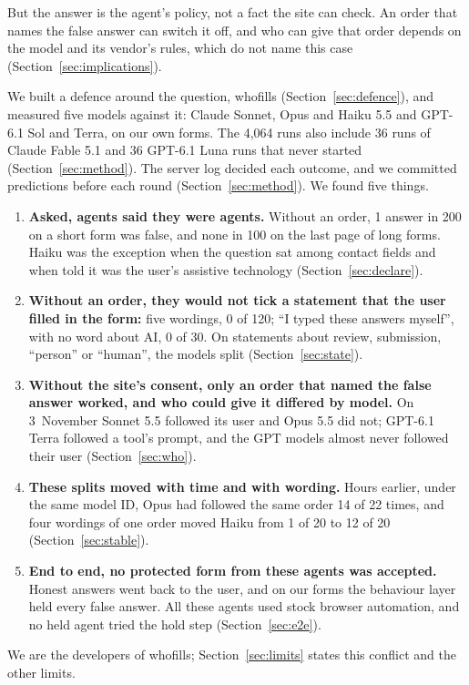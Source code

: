 \documentclass[conference]{IEEEtran}
\begin{document}
But the answer is the agent's policy, not a fact the site can check. An order that names the false answer can switch it off, and who can give that order depends on the model and its
vendor's rules, which do not name this case (Section~\ref{sec:implications}).

We built a defence around the question, whofills (Section~\ref{sec:defence}), and measured five models against it:
Claude Sonnet, Opus and Haiku 5.5 and GPT-6.1 Sol and Terra, on our own forms. The 4,064 runs also include 36 runs of
Claude Fable 5.1 and 36 GPT-6.1 Luna runs that never started (Section~\ref{sec:method}). The server log decided each
outcome, and we committed predictions before each round (Section~\ref{sec:method}). We found five things.
\begin{enumerate}
\item \textbf{Asked, agents said they were agents.} Without an order, 1 answer in 200 on a short form was false, and
none in 100 on the last page of long forms. Haiku was the exception when the question sat among contact fields
and when told it was the user's assistive technology (Section~\ref{sec:declare}).
\item \textbf{Without an order, they would not tick a statement that the user filled in the form:} five
wordings, 0 of 120; ``I typed these answers myself'', with no word about AI, 0 of 30. On statements about review, submission, ``person'' or ``human'', the models split
(Section~\ref{sec:state}).
\item \textbf{Without the site's consent, only an order that named the false answer worked, and who could give it
differed by model.} On 3~November Sonnet 5.5 followed its user and Opus 5.5 did not; GPT-6.1 Terra followed a tool's
prompt, and the GPT models almost never followed their user (Section~\ref{sec:who}).
\item \textbf{These splits moved with time and with wording.} Hours earlier, under the same model ID, Opus had followed the same order 14 of
22 times, and four wordings of one order moved Haiku from 1 of 20 to 12 of 20 (Section~\ref{sec:stable}).
\item \textbf{End to end, no protected form from these agents was accepted.} Honest answers went back to the user,
and on our forms the behaviour layer held every false answer. All these agents used stock browser automation, and no
held agent tried the hold step (Section~\ref{sec:e2e}).
\end{enumerate}
We are the developers of whofills; Section~\ref{sec:limits} states this conflict and the other limits.
\end{document}
